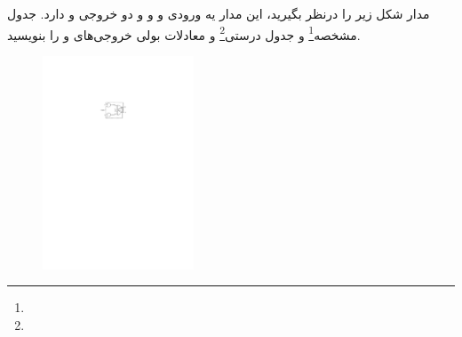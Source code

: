



مدار شکل زیر را درنظر بگیرید، این مدار یه ورودی  و  و  و دو خروجی  و  دارد. جدول مشخصه\footnote{} و جدول درستی\footnote{} و معادلات بولی خروجی‌های  و  را بنویسید.



\begin{figure}[h]
	\centering
	\includegraphics[width=0.4\textwidth]{fig/Q_opt1.pdf}
	\label{fig:Q_opt_1}
\end{figure}












%
%
%
